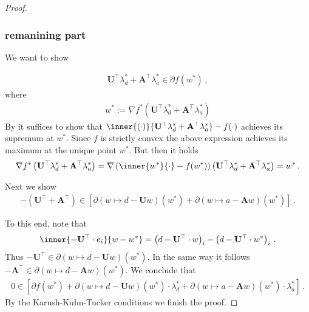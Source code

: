 \begin{proof}
\subsubsection*{remanining part}
We want to show

\begin{gather}
      \mathbf{U}^\top  \lambda_d^*
      +
      \mathbf{A}^\top  \lambda_a^*
      \in
\partial f (w^*)
\,,
\end{gather}
where
\begin{gather}
  w^*
  :=
  \nabla
    f^*
    \left( 
      \mathbf{U}^\top  \lambda_d^*
      +
      \mathbf{A}^\top  \lambda_a^*
    \right)
\end{gather}
By \cite[Theorem~23.5(a)-(b)]{Rockafellar1970}
it suffices to show
that
$
\inner
{(\cdot)}
{
      \mathbf{U}^\top  \lambda_d^*
      +
      \mathbf{A}^\top  \lambda_a^*
}
-
f(\cdot)
$
achieves its supremum at
$w^*$.
Since $f$ is strictly convex the above expression achieves its maximum at the unique
point $w^*$.
But then it holds
\begin{gather}
  \nabla
    f^*
    \left( 
      \mathbf{U}^\top  \lambda_d^*
      +
      \mathbf{A}^\top  \lambda_a^*
    \right)
    =
    \nabla
    \left( 
\inner
{w^*}
{
  \cdot
}
-
f(w^*)
    \right)
    \left( 
      \mathbf{U}^\top  \lambda_d^*
      +
      \mathbf{A}^\top  \lambda_a^*
    \right)
    =
w^*
\,.
\end{gather}

Next we show
\begin{gather}
  -
  \left( 
      \mathbf{U}^\top  
      +
      \mathbf{A}^\top  
  \right)
  \in
  \left[ 
    \partial
    \left( 
      w
      \mapsto
      d
      -
      \mathbf{U}w
    \right)
    (w^*)
    +
    \partial
    \left( 
      w
      \mapsto
      a
      -
      \mathbf{A}w
    \right)
    (w^*)
  \right]
  \,.
\end{gather}

To this end, note that
\begin{gather}
  \inner
  {
  -
\mathbf{U}^\top
\cdot e_i
}
  {w-w^*}
  =
  \left( 
    d-
\mathbf{U}^\top
\cdot w
  \right)_i
  -
  \left( 
    d-
\mathbf{U}^\top\cdot w^*
  \right)_i
  \,.
\end{gather}
Thus
$
-
\mathbf{U}^\top
\in
    \partial
    \left( 
      w
      \mapsto
      d
      -
      \mathbf{U}w
    \right)
    (w^*)
$.
In the same way it follows
$
-
\mathbf{A}^\top
\in
    \partial
    \left( 
      w
      \mapsto
      d
      -
      \mathbf{A}w
    \right)
    (w^*)
$.
We conclude that
\begin{gather}
  \mathrm{0}
  \in
  [
  \partial
  f(w^*)
  +
    \partial
    \left( 
      w
      \mapsto
      d
      -
      \mathbf{U}w
    \right)
    (w^*)
    \cdot
    \lambda_d^*
    +
    \partial
    \left( 
      w
      \mapsto
      a
      -
      \mathbf{A}w
    \right)
    (w^*)
    \cdot
    \lambda_a^*
  ]
  \,.
\end{gather}
By the Karush-Kuhn-Tucker conditions we finish the proof.
\end{proof}
